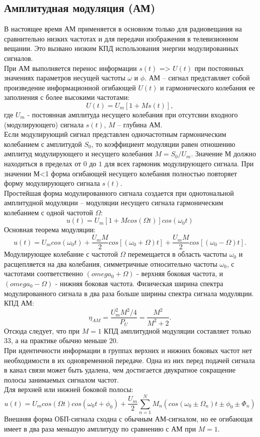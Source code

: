\documentclass[a4paper]{article}
\begin{document}
\subsection{Амплитудная модуляция (АМ)}
В настоящее время АМ применяется в основном только для радиовещания на сравнительно низких частотах и для передачи изображения в телевизионном вещании. Это вызвано низким КПД использования энергии модулированных сигналов.\\
При АМ выполняется перенос информации $s(t)$ => $U(t)$ при постоянных значениях параметров несущей частоты $\omega$ и $\phi$. АМ – сигнал представляет собой произведение информационной огибающей $U(t)$ и гармонического колебания ее заполнения с более высокими частотами: $$U(t)=U_m[1+Ms(t)],$$ где $U_m$ - постоянная амплитуда несущего колебания при отсутсвии входного (модулирующего) сигнала $s(t)$, $M$ -- глубина АМ.\\
Если модулирующий сигнал представлен одночастотным гармоническим колебанием с амплитудой $S_0$, то коэффициент модуляции равен отношению амплитуд модулирующего и несущего колебания $M=S_0/U_m$. Значение М должно находиться в пределах от $0$ до $1$ для всех гармоник модулирующего сигнала. При значении М<1 форма огибающей несущего колебания полностью повторяет форму модулирующего сигнала $s(t)$.\\
Простейшая форма модулированного сигнала создается при однотональной амплитудной модуляции -- модуляции несущего сигнала гармоническим колебанием с одной частотой $\Omega$: $$u(t)=U_m[1+Mcos(\Omega t)]cos(\omega_0 t)$$
Основная теорема модуляции:$$u(t)=U_m cos(\omega_0 t) + \frac{U_m M}{2} cos[(\omega_0 + \Omega)t] + \frac{U_m M}{2} cos[(\omega_0 - \Omega)t].$$
Модулирующее колебание с частотой $\Omega$ перемещается в область частоты $\omega_0$ и расщепляется на два колебания, симметричные относительно частоты $\omega_0$, с частотами соответственно $(omega_0 + \Omega)$ - верхняя боковая частота, и $(omega_0 - \Omega)$ - нижняя боковая частота. Физическая ширина спектра модулированного сигнала в два раза больше ширины спектра сигнала модуляции.\\
КПД АМ: $$\eta_{AM}=\frac{U_m^2 M^2 /4}{P_U} = \frac{M^2}{M^2+2}.$$
Отсюда следует, что при $M=1$ КПД амплитудной модуляции составляет только $33$, а на практике обычно меньше $20$.\\
При идентичности информации в группах верхних и нижних боковых частот нет необходимости в их одновременной передаче. Одна из них перед подачей сигнала в канал связи может быть удалена, чем достигается двукратное сокращение полосы занимаемых сигналом частот.\\
Для верхней или нижней боковой полосы:
$$u(t)=U_m cos(\Omega t)cos(\omega_0 t+\phi_0) + \frac{U_m}{2} \sum_{n=1}^N M_n (cos(\omega_0 \pm \Omega_n)t \pm \phi_0 \pm \Phi_n)$$
Внешняя форма ОБП-сигнала сходна с обычным АМ-сигналом, но ее огибающая имеет в два раза меньшую амплитуду по сравнению с АМ при $M = 1$.
\end{document}
